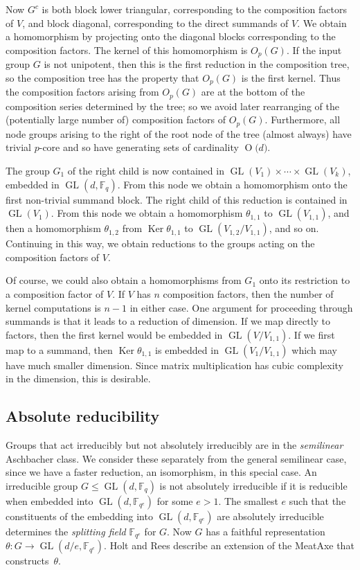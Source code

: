 \documentclass[12pt,twoside,reqno,psamsfonts]{amsproc}
\numberwithin{equation}{section}
\numberwithin{figure}{section}
\theoremstyle{plain}
\theoremstyle{definition}
\theoremstyle{remark}
\newcommand{\field}[1]{\mathbb{#1}}
\newcommand{\F}{\field{F}}
\DeclareMathOperator{\GL}{GL}
\DeclareMathOperator{\Ker}{Ker}
\newcommand{\OR}[1]{\operatorname{O} \bigl( #1 \bigr)}
\begin{document}
Now $G^c$ is both block lower triangular, corresponding to the
composition factors of $V$, and block diagonal, corresponding to the
direct summands of $V$. We obtain a homomorphism by projecting onto
the diagonal blocks corresponding to the composition factors. The
kernel of this homomorphism is ${O}_p(G)$. 
If the input group $G$ is not unipotent, then this is the first reduction
in the composition tree, so the 
composition tree has the property that ${O}_p(G)$ is the first
kernel. Thus the composition factors arising from
${O}_p(G)$ are at the bottom of the composition series
determined by the tree; so we avoid later
rearranging of the (potentially large number of) composition factors
of ${O}_p(G)$. Furthermore, all node groups  arising to the right
of the root node of the tree (almost always) have trivial $p$-core
and so have generating sets of cardinality $\OR{d}$.

The group $G_1$ of the right child is now contained in $\GL(V_1) \times
\dotsm \times \GL(V_k)$, embedded in $\GL(d, \F_q)$. From this node we
obtain a homomorphism onto the first non-trivial summand
block. The right child of this reduction is contained in $\GL(V_1)$.
From this node we obtain a homomorphism $\theta_{1,1}$ to
$\GL(V_{1,1})$, and then a homomorphism $\theta_{1,2}$ from $\Ker \theta_{1,1}$
to $\GL(V_{1,2}/V_{1,1})$, and so on. 
Continuing in this way, we obtain reductions to the groups acting on
the composition factors of $V$. 

Of course, we could also obtain a homomorphisms from $G_1$
onto its restriction to a composition factor of $V$.
If $V$ has  $n$ composition factors,
then the number of kernel computations is $n-1$ in either case.
One argument for proceeding through summands is that it leads to a
reduction of dimension. If we
map directly to factors, then the first kernel would be embedded in
$\GL(V / V_{1,1})$. If we first map to a summand, then $\Ker
\theta_{1,1}$ is embedded in $\GL(V_1 / V_{1, 1})$ which may have much
smaller dimension. Since matrix multiplication
has cubic complexity in the dimension, this is desirable.

\subsection{Absolute reducibility}
Groups that act irreducibly but not absolutely irreducibly are in 
the \emph{semilinear} Aschbacher class. We consider
these separately from the general semilinear case, since we have a faster
reduction, an isomorphism, in this special case. 
An irreducible group $G \leqslant \GL(d, \F_q)$ is
not absolutely irreducible if it is reducible when embedded 
into $\GL(d, \F_{q^e})$
for some $e > 1$. The smallest $e$ such that the constituents of
the embedding into $\GL(d, \F_{q^e})$ are absolutely irreducible determines the
\emph{splitting field} $\F_{q^e}$ for $G$. Now $G$ has a faithful
representation $\theta : G \to \GL(d/e, \F_{q^e})$.
Holt and Rees \cite{meataxe} describe an extension of the {\sc MeatAxe}
that constructs~$\theta$.  
\end{document}
